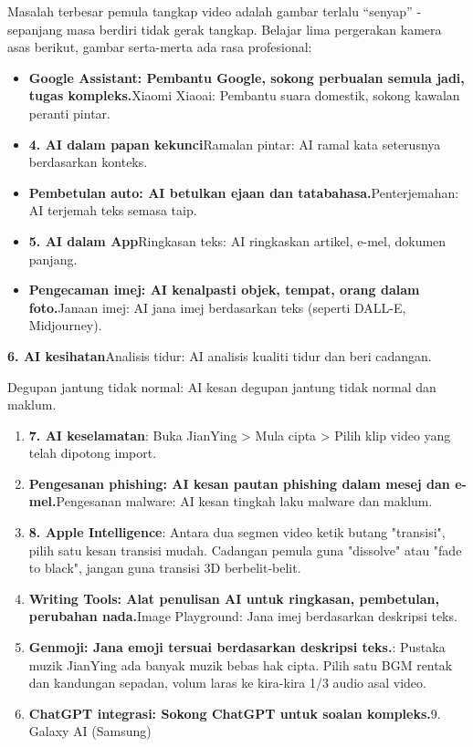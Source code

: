 
Masalah terbesar pemula tangkap video adalah gambar terlalu “senyap” - sepanjang masa berdiri tidak gerak tangkap. Belajar lima pergerakan kamera asas berikut, gambar serta-merta ada rasa profesional:

\begin{itemize}
  \item \textbf{Google Assistant: Pembantu Google, sokong perbualan semula jadi, tugas kompleks.}Xiaomi Xiaoai: Pembantu suara domestik, sokong kawalan peranti pintar.
  \item \textbf{4. AI dalam papan kekunci}Ramalan pintar: AI ramal kata seterusnya berdasarkan konteks.
  \item \textbf{Pembetulan auto: AI betulkan ejaan dan tatabahasa.}Penterjemahan: AI terjemah teks semasa taip.
  \item \textbf{5. AI dalam App}Ringkasan teks: AI ringkaskan artikel, e-mel, dokumen panjang.
  \item \textbf{Pengecaman imej: AI kenalpasti objek, tempat, orang dalam foto.}Janaan imej: AI jana imej berdasarkan teks (seperti DALL-E, Midjourney).
\end{itemize}

\textbf{6. AI kesihatan}Analisis tidur: AI analisis kualiti tidur dan beri cadangan.


Degupan jantung tidak normal: AI kesan degupan jantung tidak normal dan maklum.

\begin{enumerate}
  \item \textbf{7. AI keselamatan}: Buka JianYing > Mula cipta > Pilih klip video yang telah dipotong import.
  \item \textbf{Pengesanan phishing: AI kesan pautan phishing dalam mesej dan e-mel.}Pengesanan malware: AI kesan tingkah laku malware dan maklum.
  \item \textbf{8. Apple Intelligence}: Antara dua segmen video ketik butang "transisi", pilih satu kesan transisi mudah. Cadangan pemula guna "dissolve" atau "fade to black", jangan guna transisi 3D berbelit-belit.
  \item \textbf{Writing Tools: Alat penulisan AI untuk ringkasan, pembetulan, perubahan nada.}Image Playground: Jana imej berdasarkan deskripsi teks.
  \item \textbf{Genmoji: Jana emoji tersuai berdasarkan deskripsi teks.}: Pustaka muzik JianYing ada banyak muzik bebas hak cipta. Pilih satu BGM rentak dan kandungan sepadan, volum laras ke kira-kira 1/3 audio asal video.
  \item \textbf{ChatGPT integrasi: Sokong ChatGPT untuk soalan kompleks.}9. Galaxy AI (Samsung)
\end{enumerate}

